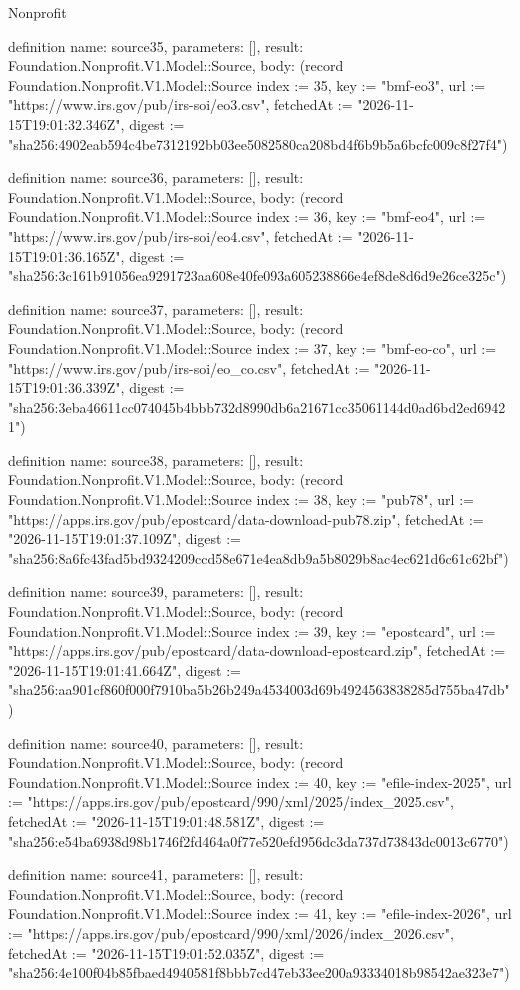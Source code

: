 \begin{lexlean}{Nonprofit}
\begin{semanticmodule}
definition{
  name: source35,
  parameters: [],
  result: Foundation.Nonprofit.V1.Model::Source,
  body: (record Foundation.Nonprofit.V1.Model::Source {index := 35, key := "bmf-eo3", url := "https://www.irs.gov/pub/irs-soi/eo3.csv", fetchedAt := "2026-11-15T19:01:32.346Z", digest := "sha256:4902eab594c4be7312192bb03ee5082580ca208bd4f6b9b5a6bcfc009c8f27f4"})
}

definition{
  name: source36,
  parameters: [],
  result: Foundation.Nonprofit.V1.Model::Source,
  body: (record Foundation.Nonprofit.V1.Model::Source {index := 36, key := "bmf-eo4", url := "https://www.irs.gov/pub/irs-soi/eo4.csv", fetchedAt := "2026-11-15T19:01:36.165Z", digest := "sha256:3c161b91056ea9291723aa608e40fe093a605238866e4ef8de8d6d9e26ce325c"})
}

definition{
  name: source37,
  parameters: [],
  result: Foundation.Nonprofit.V1.Model::Source,
  body: (record Foundation.Nonprofit.V1.Model::Source {index := 37, key := "bmf-eo-co", url := "https://www.irs.gov/pub/irs-soi/eo_co.csv", fetchedAt := "2026-11-15T19:01:36.339Z", digest := "sha256:3eba46611cc074045b4bbb732d8990db6a21671cc35061144d0ad6bd2ed69421"})
}

definition{
  name: source38,
  parameters: [],
  result: Foundation.Nonprofit.V1.Model::Source,
  body: (record Foundation.Nonprofit.V1.Model::Source {index := 38, key := "pub78", url := "https://apps.irs.gov/pub/epostcard/data-download-pub78.zip", fetchedAt := "2026-11-15T19:01:37.109Z", digest := "sha256:8a6fc43fad5bd9324209ccd58e671e4ea8db9a5b8029b8ac4ec621d6c61c62bf"})
}

definition{
  name: source39,
  parameters: [],
  result: Foundation.Nonprofit.V1.Model::Source,
  body: (record Foundation.Nonprofit.V1.Model::Source {index := 39, key := "epostcard", url := "https://apps.irs.gov/pub/epostcard/data-download-epostcard.zip", fetchedAt := "2026-11-15T19:01:41.664Z", digest := "sha256:aa901cf860f000f7910ba5b26b249a4534003d69b4924563838285d755ba47db"})
}

definition{
  name: source40,
  parameters: [],
  result: Foundation.Nonprofit.V1.Model::Source,
  body: (record Foundation.Nonprofit.V1.Model::Source {index := 40, key := "efile-index-2025", url := "https://apps.irs.gov/pub/epostcard/990/xml/2025/index_2025.csv", fetchedAt := "2026-11-15T19:01:48.581Z", digest := "sha256:e54ba6938d98b1746f2fd464a0f77e520efd956dc3da737d73843dc0013c6770"})
}

definition{
  name: source41,
  parameters: [],
  result: Foundation.Nonprofit.V1.Model::Source,
  body: (record Foundation.Nonprofit.V1.Model::Source {index := 41, key := "efile-index-2026", url := "https://apps.irs.gov/pub/epostcard/990/xml/2026/index_2026.csv", fetchedAt := "2026-11-15T19:01:52.035Z", digest := "sha256:4e100f04b85fbaed4940581f8bbb7cd47eb33ee200a93334018b98542ae323e7"})
}


\end{semanticmodule}
\end{lexlean}
